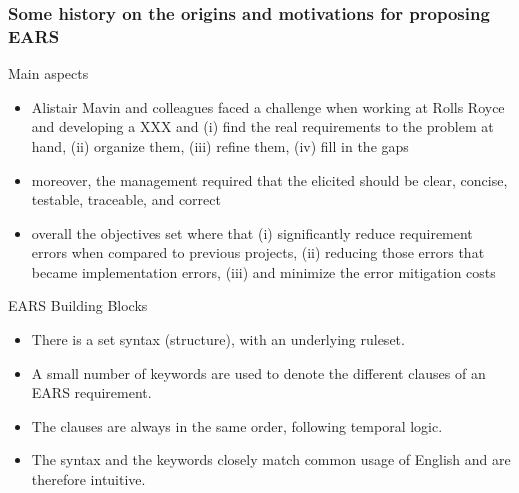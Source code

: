 \documentclass[aspectratio=169]{beamer}
\begin{document}
\begin{frame}
  \frametitle{Some history on the origins and motivations for proposing EARS}
  \begin{block}{Main aspects}
  \begin{itemize}
    \item Alistair Mavin and colleagues faced a challenge when working at Rolls Royce and developing a XXX and (i) find the real requirements to the problem at hand, (ii) organize them, (iii) refine them, (iv) fill in the gaps 
    \item moreover, the management required that the elicited should be clear, concise, testable, traceable, and correct
    \item overall the objectives set where that (i) significantly reduce requirement errors when compared to previous projects, (ii) reducing those errors that became implementation errors, (iii) and minimize the error mitigation costs   
  \end{itemize}
  \end{block}
\end{frame}
%
\begin{frame}
 \begin{block}{EARS Building Blocks}
  \begin{itemize}
    \item There is a set syntax (structure), with an underlying ruleset. 
    \item A small number of keywords are used to denote the different clauses of an EARS requirement. 
    \item The clauses are always in the same order, following temporal logic. 
    \item The syntax and the keywords closely match common usage of English and are therefore intuitive.
  \end{itemize}  
 \end{block}
\end{frame}
%
\end{document}
